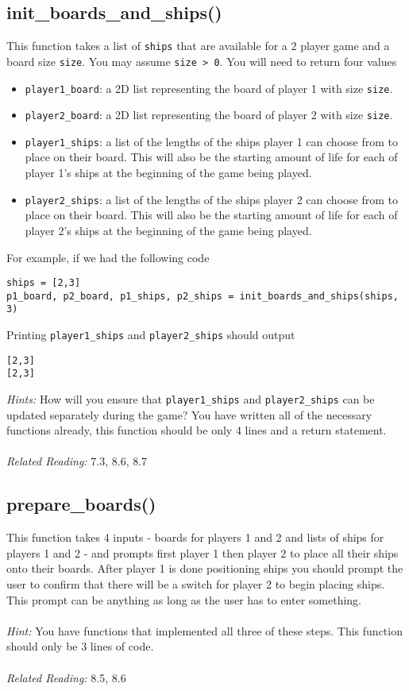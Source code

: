 \documentclass{article}
\begin{document}
\subsection{init\_boards\_and\_ships()}
This function takes a list of \texttt{ships} that are available for a 2 player game and a board size \texttt{size}. You may assume \texttt{size > 0}. You will need to return four values
\begin{itemize}
    \item \texttt{player1\_board}: a 2D list representing the board of player 1 with size \texttt{size}.
    \item \texttt{player2\_board}: a 2D list representing the board of player 2 with size \texttt{size}.
    \item \texttt{player1\_ships}: a list of the lengths of the ships player 1 can choose from to place on their board. This will also be the starting amount of life for each of player 1's ships at the beginning of the game being played.
    \item \texttt{player2\_ships}: a list of the lengths of the ships player 2 can choose from to place on their board. This will also be the starting amount of life for each of player 2's ships at the beginning of the game being played.
\end{itemize}
For example, if we had the following code
\begin{verbatim}
ships = [2,3]
p1_board, p2_board, p1_ships, p2_ships = init_boards_and_ships(ships, 3)
\end{verbatim}
Printing \texttt{player1\_ships} and \texttt{player2\_ships} should output
\begin{verbatim}
[2,3]
[2,3]
\end{verbatim}
\textit{Hints:} How will you ensure that \texttt{player1\_ships} and \texttt{player2\_ships} can be updated separately during the game? You have written all of the necessary functions already, this function should be only 4 lines and a return statement.\\\\
\textit{Related Reading:} 7.3, 8.6, 8.7

\subsection{prepare\_boards()}
This function takes 4 inputs - boards for players 1 and 2 and lists of ships for players 1 and 2 - and prompts first player 1 then player 2 to place all their ships onto their boards. After player 1 is done positioning ships you should prompt the user to confirm that there will be a switch for player 2 to begin placing ships. This prompt can be anything as long as the user has to enter something.\\\\
\textit{Hint:} You have functions that implemented all three of these steps. This function should only be 3 lines of code.\\\\
\textit{Related Reading:} 8.5, 8.6
\end{document}
